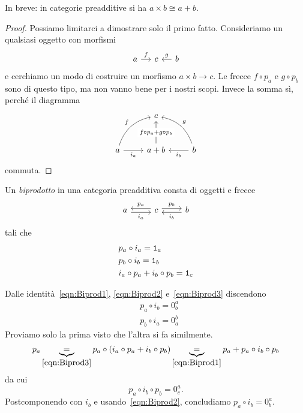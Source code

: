 In breve: in categorie preadditive si ha \(a \times b \cong a+b\).

\begin{proof}
  Possiamo limitarci a dimostrare solo il primo fatto. Consideriamo un
  qualsiasi oggetto con morfismi
  \[
    \begin{tikzcd}[column sep=small]
      a \ar["f", r] & c & b \ar["g", l, swap]
    \end{tikzcd}
  \]
  e cerchiamo un modo di costruire un morfismo \(a \times b \to c\). Le
  frecce \(f \circ p_a\) e \(g \circ p_b\) sono di questo tipo, ma non vanno
  bene per i nostri scopi. Invece la somma sì, perché il diagramma
  \[
    \begin{tikzcd}[row sep=large]
      & c \\
      a \ar["{i_a}", r, swap] \ar["f", ur, bend left] & a + b \ar["{f \circ p_a + g \circ
        p_b}" description, u] & b
      \ar["{i_b}", l] \ar["g", ul, bend right, swap]
    \end{tikzcd}
  \]
  commuta.
\end{proof}

\begin{definition}\label{definition:Biprodotto}
  Un {\em biprodotto} in una categoria preadditiva consta di oggetti e frecce
  \[
    \begin{tikzcd}
      a \ar["{i_a}", r, shift right, swap] & c \ar["{p_a}", l, shift
      right, swap] \ar["{p_b}", r, shift left] & b \ar["{i_b}", l,
      shift left]
    \end{tikzcd}
  \]
  tali che
  \begin{align}
    & p_a \circ i_a = \mathtt 1_a \label{eqn:Biprod1} \\
    & p_b \circ i_b = \mathtt 1_b \label{eqn:Biprod2}\\
    & i_a \circ p_a + i_b \circ p_b = \mathtt 1_c \label{eqn:Biprod3}
  \end{align}
\end{definition}

\begin{remark}
  Dalle identità~\ref{eqn:Biprod1}, \ref{eqn:Biprod2}
  e~\ref{eqn:Biprod3} discendono
  \begin{align}
    & p_a \circ i_b = 0_b^a \label{eqn:Biprod4} \\
    & p_b \circ i_a = 0_a^b \label{eqn:Biprod5}
  \end{align}
  Proviamo solo la prima visto che l'altra si fa similmente.
  \[
    p_a \underbrace{=}_{\eqref{eqn:Biprod3}} p_a \circ \left( i_a \circ p_a + i_b \circ p_b \right) \underbrace{=}_{\eqref{eqn:Biprod1}} p_a + p_a \circ i_b \circ p_b
  \]
  da cui
  \[
    p_a \circ i_b \circ p_b = 0_c^a .
  \]
  Postcomponendo con \(i_b\) e usando~\eqref{eqn:Biprod2}, concludiamo \(p_a \circ i_b = 0_b^a\).
\end{remark}

